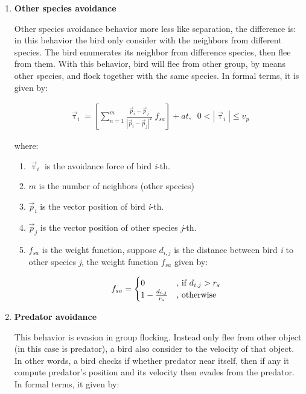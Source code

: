 \documentclass[journal,transmag]{IEEEtran}
\begin{document}
\begin{enumerate}[-]
\item \textbf{Other species avoidance}

Other species avoidance behavior more less like separation, the difference is: in this behavior the bird only consider with the neighbors from different species. The bird enumerates its neighbor from difference species, then flee from them. With this behavior, bird will flee from other group, by means other species, and flock together with the same species. In formal terms, it is given by:

\begin{align}
\vec{\uptau}_i = \left[\sum_{n=1}^m{\frac{\vec{p}_i - \vec{p}_j}{|\vec{p}_i - \vec{p}_j|^2}} \;f_{sa}\right] + at, \;\;0 < |\vec{\uptau}_i| \leq v_p
\end{align}

where:

\begin{enumerate}
\item \(\vec{\uptau}_i\) is the avoidance force of bird \emph{i}-th. 
\item \(m\) is the number of neighbors (other species)
\item \(\vec{p}_i\) is the vector position of bird \emph{i}-th.
\item \(\vec{p}_j\) is the vector position of other species \emph{j}-th.
\item \(f_{sa}\) is the weight function, suppose \(d_{i,j}\) is the distance between bird \emph{i} to other species \emph{j}, the weight function \(f_{sa}\) given by:

\begin{equation*}
	f_{sa} = \begin{cases}
	0 &\text{, if $ d_{i,j} > r_s$}\\
	1 - \frac{d_{i,j}}{r_s} &\text{, otherwise}
	\end{cases}
\end{equation*}
\end{enumerate}

\item \textbf{Predator avoidance}

This behavior is evasion in group flocking. Instead only flee from other object (in this case is predator), a bird also consider to the velocity of that object. In other words, a bird checks if whether predator near itself, then if any it compute predator's position and its velocity then evades from the predator. In formal terms, it given by:


\end{enumerate}
\end{document}
